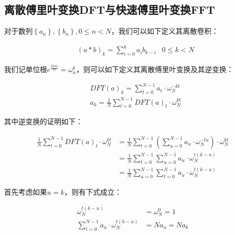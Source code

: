 \documentclass[UTF8]{book}
\begin{document}
\subsection{离散傅里叶变换DFT与快速傅里叶变换FFT}
对于数列$\left \{ a_n \right \}, \left \{ b_n \right \},0 \le n < N$，我们可以如下定义其离散卷积：
\begin{large}
    \begin{equation}
        \begin{aligned}
            &\left ( a*b \right )_k=\sum_{i=0}^{k}{a_ib_{k-i}} & 0 \le k < N
            \nonumber
        \end{aligned}
    \end{equation}
\end{large}
我们记单位根\large{$e^{\frac{2k\pi i}{n}}=\omega_{n}^k$}，则可以如下定义其离散傅里叶变换及其逆变换：
\begin{large}
    \begin{equation}
        \begin{aligned}
            &DFT(a)_k=\sum_{t=0}^{N-1}{a_t \cdot \omega_{N}^{-kt}} \\
            &a_k=\frac{1}{N}\sum_{t=0}^{N-1}{DFT(a)_t \cdot \omega_{N}^{kt}}
            \nonumber
        \end{aligned}
    \end{equation}
\end{large}
其中逆变换的证明如下：
\begin{large}
    \begin{equation}
        \begin{aligned}
            \frac{1}{N}\sum_{t=0}^{N-1}{DFT(a)_t \cdot \omega_{N}^{kt}} &= \frac{1}{N}\sum_{t=0}^{N-1}\left ( \sum_{u=0}^{N-1}a_u \cdot \omega_N^{-tu} \right ) \cdot \omega_{N}^{kt} \\
            &= \frac{1}{N}\sum_{t=0}^{N-1}\sum_{u=0}^{N-1}a_u \cdot \omega_N^{t(k-u)} \\
            &= \frac{1}{N}\sum_{u=0}^{N-1}\sum_{t=0}^{N-1}a_u \cdot \omega_N^{t(k-u)}
            \nonumber
        \end{aligned}
    \end{equation}
\end{large}
首先考虑如果$u=k$，则有下式成立：
\begin{large}
    \begin{equation}
        \begin{aligned}
            \omega_N^{t(k-u)}&=\omega_N^{0}=1 \\
            \sum_{t=0}^{N-1}a_u \cdot \omega_N^{t(k-u)}&=Na_u=Na_k
            \nonumber
        \end{aligned}
    \end{equation}
\end{large}
\end{document}
